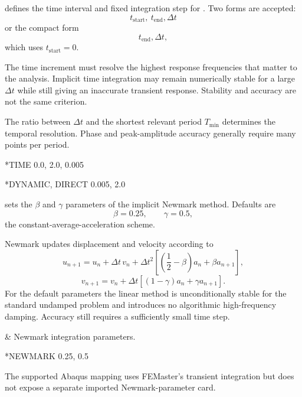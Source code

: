 
 defines the time interval and fixed integration step for . Two forms are accepted:
\[
t_\mathrm{start},\ t_\mathrm{end},\Delta t
\]
or the compact form
\[
t_\mathrm{end},\Delta t,
\]
which uses \(t_\mathrm{start}=0\).

The time increment must resolve the highest response frequencies that matter to the analysis. Implicit time integration may remain numerically stable for a large \(\Delta t\) while still giving an inaccurate transient response. Stability and accuracy are not the same criterion.

The ratio between \(\Delta t\) and the shortest relevant period \(T_\mathrm{min}\) determines the temporal resolution. Phase and peak-amplitude accuracy generally require many points per period.

\exampleheading
\begin{dialectexamples}
\begin{femasterdeck}
*TIME
0.0, 2.0, 0.005
\end{femasterdeck}
\begin{abaqusdeck}
*DYNAMIC, DIRECT
0.005, 2.0
\end{abaqusdeck}
\end{dialectexamples}


 sets the \(\beta\) and \(\gamma\) parameters of the implicit Newmark method. Defaults are
\[
\beta=0.25,\qquad\gamma=0.5,
\]
the constant-average-acceleration scheme.

Newmark updates displacement and velocity according to
\[
u_{n+1}
=u_n+\Delta t\,v_n
+\Delta t^2\left[\left(\frac12-\beta\right)a_n+\beta a_{n+1}\right],
\]
\[
v_{n+1}
=v_n+\Delta t\left[(1-\gamma)a_n+\gamma a_{n+1}\right].
\]
For the default parameters the linear method is unconditionally stable for the standard undamped problem and introduces no algorithmic high-frequency damping. Accuracy still requires a sufficiently small time step.

\begin{keyworddata}
 & Newmark integration parameters. \\
\end{keyworddata}

\exampleheading
\begin{dialectexamples}
\begin{femasterdeck}
*NEWMARK
0.25, 0.5
\end{femasterdeck}
\begin{noabaqus}
The supported Abaqus  mapping uses FEMaster's transient integration but does not expose a separate imported Newmark-parameter card.
\end{noabaqus}
\end{dialectexamples}

